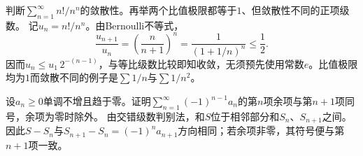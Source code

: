 判断\(\sum_{n=1}^{\infty}n!/n^n\)的敛散性。再举两个比值极限都等于\(1\)、但敛散性不同的正项级数。
\solutionanswer
记\(u_n=n!/n^n\)。由Bernoulli不等式，
\[
\frac{u_{n+1}}{u_n}=\left(\frac n{n+1}\right)^n
=\frac1{(1+1/n)^n}\le\frac12.
\]
因而\(u_n\le u_1\,2^{-(n-1)}\)，与等比级数比较即知收敛，无须预先使用常数\(e\)。比值极限均为\(1\)而敛散不同的例子是\(\sum1/n\)与\(\sum1/n^2\)。


设\(a_n\ge0\)单调不增且趋于零。证明\(\sum_{n=1}^{\infty}(-1)^{n-1}a_n\)的第\(n\)项余项与第\(n+1\)项同号，余项为零时除外。
\solutionanswer
由交错级数判别法，和\(S\)位于相邻部分和\(S_n\)、\(S_{n+1}\)之间。因此\(S-S_n\)与\(S_{n+1}-S_n=(-1)^na_{n+1}\)方向相同；若余项非零，其符号便与第\(n+1\)项一致。
\par
